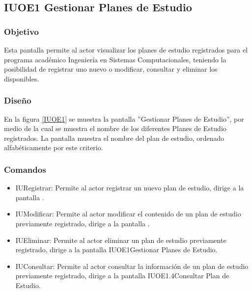 \subsection{IUOE1 Gestionar Planes de Estudio}

\subsubsection{Objetivo}
	
	Esta pantalla permite al actor visualizar los planes de estudio registrados para el programa académico Ingeniería en Sistemas Computacionales, teniendo la posibilidad de registrar uno nuevo o modificar, consultar y eliminar los disponibles.

\subsubsection{Diseño}

    En la figura \ref{IUOE1} se muestra la pantalla ''Gestionar Planes de Estudio'', por medio de la cual se muestra el nombre de los diferentes Planes de Estudio registrados. La pantalla muestra el nombre del plan de estudio, ordenado alfabéticamente por este criterio.
 

\subsubsection{Comandos}
    \begin{itemize}
		\item IURegistrar: Permite al actor registrar un nuevo plan de estudio, dirige a la pantalla .
		
		\item IUModificar: Permite al actor modificar el contenido de un plan de estudio previamente registrado, dirige a la pantalla .
		
		\item IUEliminar: Permite al actor eliminar un plan de estudio previamente registrado, dirige a la pantalla {IUOE1}{Gestionar Planes de Estudio}.
		
		\item IUConsultar: Permite al actor consultar la información de un plan de estudio previamente registrado, dirige a la pantalla {IUOE1.4}{Consultar Plan de Estudio}.
    \end{itemize}
